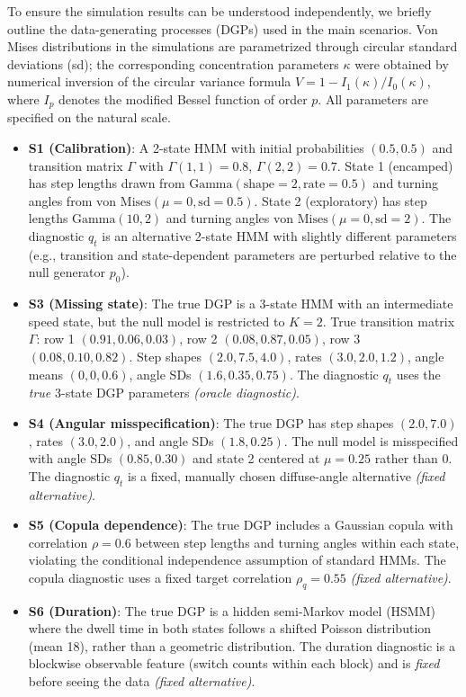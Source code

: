 \documentclass[pdflatex,sn-basic]{sn-jnl}
\newcommand{\1}{\mathbf 1}
\begin{document}
To ensure the simulation results can be understood independently, we briefly outline the data-generating processes (DGPs) used in the main scenarios. Von Mises distributions in the simulations are parametrized through circular standard deviations (sd); the corresponding concentration parameters $\kappa$ were obtained by numerical inversion of the circular variance formula $V = 1 - I_1(\kappa)/I_0(\kappa)$, where $I_p$ denotes the modified Bessel function of order $p$. All parameters are specified on the natural scale.

\begin{itemize}
    \item \textbf{S1 (Calibration)}: A 2-state HMM with initial probabilities $(0.5, 0.5)$ and transition matrix $\Gamma$ with $\Gamma(1,1)=0.8$, $\Gamma(2,2)=0.7$. State 1 (encamped) has step lengths drawn from $\text{Gamma}(\text{shape}=2, \text{rate}=0.5)$ and turning angles from $\text{von Mises}(\mu=0, \text{sd}=0.5)$. State 2 (exploratory) has step lengths $\text{Gamma}(10, 2)$ and turning angles $\text{von Mises}(\mu=0, \text{sd}=2)$. The diagnostic $q_t$ is an alternative 2-state HMM with slightly different parameters (e.g., transition and state-dependent parameters are perturbed relative to the null generator $p_0$).
    \item \textbf{S3 (Missing state)}: The true DGP is a 3-state HMM with an intermediate speed state, but the null model is restricted to $K=2$. True transition matrix $\Gamma$: row 1 $(0.91, 0.06, 0.03)$, row 2 $(0.08, 0.87, 0.05)$, row 3 $(0.08, 0.10, 0.82)$. Step shapes $(2.0, 7.5, 4.0)$, rates $(3.0, 2.0, 1.2)$, angle means $(0, 0, 0.6)$, angle SDs $(1.6, 0.35, 0.75)$. The diagnostic $q_t$ uses the \emph{true} 3-state DGP parameters \emph{(oracle diagnostic)}.
    \item \textbf{S4 (Angular misspecification)}: The true DGP has step shapes $(2.0, 7.0)$, rates $(3.0, 2.0)$, and angle SDs $(1.8, 0.25)$. The null model is misspecified with angle SDs $(0.85, 0.30)$ and state 2 centered at $\mu=0.25$ rather than $0$. The diagnostic $q_t$ is a fixed, manually chosen diffuse-angle alternative \emph{(fixed alternative)}.
    \item \textbf{S5 (Copula dependence)}: The true DGP includes a Gaussian copula with correlation $\rho = 0.6$ between step lengths and turning angles within each state, violating the conditional independence assumption of standard HMMs. The copula diagnostic uses a fixed target correlation $\rho_q = 0.55$ \emph{(fixed alternative)}.
    \item \textbf{S6 (Duration)}: The true DGP is a hidden semi-Markov model (HSMM) where the dwell time in both states follows a shifted Poisson distribution (mean 18), rather than a geometric distribution. The duration diagnostic is a blockwise observable feature (switch counts within each block) and is \emph{fixed} before seeing the data \emph{(fixed alternative)}.

\end{itemize}
\end{document}
